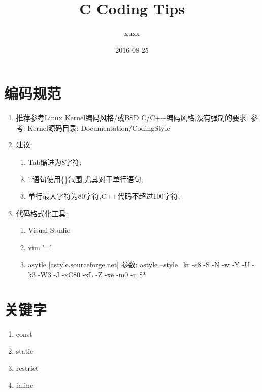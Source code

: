 ﻿

\title{C Coding Tips}
\author{xuxx}
\date{2016-08-25}


\begin{titlepage}
\maketitle
\end{titlepage}

\section{编码规范}
\begin{enumerate}
        \item 推荐参考Linux Kernel编码风格/或BSD C/C++编码风格,没有强制的要求.
                参考: Kernel源码目录: Documentation/CodingStyle
        \item 建议:
            \begin{enumerate}
            \item Tab缩进为8字符;
            \item if语句使用\{\}包围,尤其对于单行语句;
            \item 单行最大字符为80字符,C++代码不超过100字符;
            \end{enumerate}
        \item 代码格式化工具:
            \begin{enumerate}
            \item Visual Studio
            \item vim '='
            \item asytle [astyle.sourceforge.net]
                    参数:
                    astyle --style=kr -s8 -S -N -w -Y -U -k3 -W3 -J -xC80 -xL -Z -xe -m0 -n \$*
            \end{enumerate}
\end{enumerate}

\section{关键字}

\begin{enumerate}
\item const
\item static
\item restrict
\item inline
\end{enumerate}


